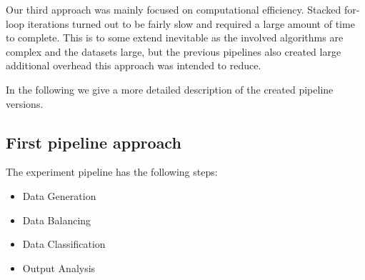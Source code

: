 Our third approach was mainly focused on computational efficiency. 
Stacked for-loop iterations turned out to be fairly slow and required a large amount of time to complete.
This is to some extend inevitable as the involved algorithms are complex and the datasets large, 
but the previous pipelines also created large additional overhead this approach was intended to reduce.

In the following we give a more detailed description of the created pipeline versions.

\subsection{First pipeline approach}

The experiment pipeline has the following steps:

\begin{itemize}
\item
  Data Generation
\item
  Data Balancing
\item
  Data Classification
\item
  Output Analysis
\end{itemize}

